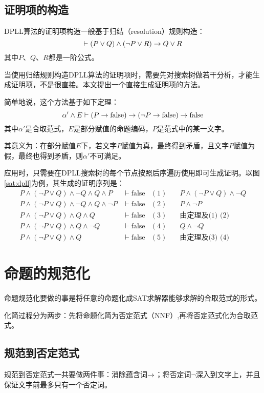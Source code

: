 \subsection{证明项的构造}
DPLL算法的证明项构造一般基于归结（resolution）规则构造：
$$\vdash (P \lor Q) \land (\lnot P \lor R) \rightarrow Q \lor R$$
其中$P$、$Q$、$R$都是一阶公式。

当使用归结规则构造DPLL算法的证明项时，需要先对搜索树做若干分析，才能生成证明项，不是很直接。本文提出一个直接生成证明项的方法。

简单地说，这个方法基于如下定理：
$$\alpha' \land E \vdash (P \rightarrow \mathrm{false}) \rightarrow (\lnot P \rightarrow \mathrm{false}) \rightarrow \mathrm{false} $$
其中$\alpha'$是合取范式，$E$是部分赋值的命题编码，$P$是范式中的某一文字。

其意义为：在部分赋值$E$下，若文字$P$赋值为真，最终得到矛盾，且文字$P$赋值为假，最终也得到矛盾，则$\alpha'$不可满足。

应用时，只需要在DPLL搜索树的每个节点按照后序遍历使用即可生成证明。以图\ref{sat:dpll}为例，其生成的证明序列是：
\begin{align*}
  P \land (\lnot P \lor Q) \land \lnot Q \land Q \land P & \vdash \mathrm{false} & (1) & \quad P \land (\lnot P \lor Q) \land \lnot Q \\
  P \land (\lnot P \lor Q) \land \lnot Q \land Q \land \lnot P & \vdash \mathrm{false} & (2) & \quad P \land \lnot P \\
  P \land (\lnot P \lor Q) \land Q \land Q  & \vdash \mathrm{false} & (3) & \quad \text{由定理及(1) (2)}\\
  P \land (\lnot P \lor Q) \land Q \land \lnot Q & \vdash \mathrm{false} & (4) & \quad Q \land \lnot Q \\
  P \land (\lnot P \lor Q) \land Q & \vdash \mathrm{false} & (5) & \quad \text{由定理及(3) (4)}
\end{align*}

\section{命题的规范化}
命题规范化要做的事是将任意的命题化成SAT求解器能够求解的合取范式的形式。

化简过程分为两步：先将命题化简为否定范式（NNF）,再将否定范式化为合取范式。

\subsection{规范到否定范式}
规范到否定范式一共要做两件事：消除蕴含词$\rightarrow$；将否定词$\lnot$深入到文字上，并且保证文字前最多只有一个否定词。

